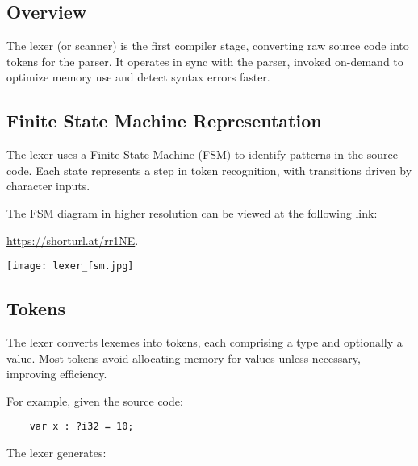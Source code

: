 \documentclass[12pt,a4paper]{article}
\begin{document}
\subsection{Overview}
The lexer (or scanner) is the first compiler stage, converting raw source code into tokens for the parser. It operates in sync with the parser, invoked on-demand to optimize memory use and detect syntax errors faster.

\subsection{Finite State Machine Representation}
The lexer uses a Finite-State Machine (FSM) to identify patterns in the source code. Each state represents a step in token recognition, with transitions driven by character inputs.

The FSM diagram in higher resolution can be viewed at the following link:  

\href{https://shorturl.at/rr1NE}{https://shorturl.at/rr1NE}.

\begin{center}
    \texttt{[image: lexer\_fsm.jpg]} %
\end{center}

\subsection{Tokens}
The lexer converts lexemes into tokens, each comprising a type and optionally a value. Most tokens avoid allocating memory for values unless necessary, improving efficiency.

For example, given the source code:
\begin{verbatim}
    var x : ?i32 = 10;
\end{verbatim}

The lexer generates:
\end{document}

